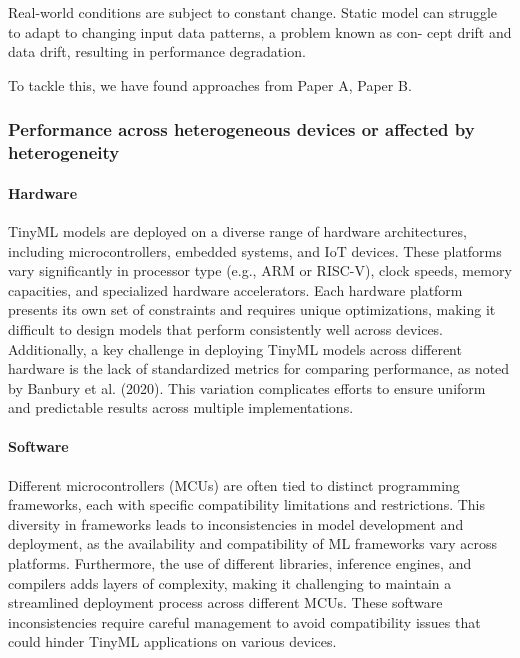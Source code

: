 \documentclass[twocolumn]{article}
\begin{document}
Real-world conditions are subject to constant change. Static model can struggle to adapt to changing input data patterns, a problem known as con- cept drift and data drift, resulting in performance degradation.

To tackle this, we have found approaches from Paper A, Paper B.

\subsubsection{Performance across heterogeneous devices or affected by heterogeneity}

\paragraph{Hardware} TinyML models are deployed on a diverse range of hardware architectures, including microcontrollers, embedded systems, and IoT devices. These platforms vary significantly in processor type (e.g., ARM or RISC-V), clock speeds, memory capacities, and specialized hardware accelerators. Each hardware platform presents its own set of constraints and requires unique optimizations, making it difficult to design models that perform consistently well across devices. Additionally, a key challenge in deploying TinyML models across different hardware is the lack of standardized metrics for comparing performance, as noted by Banbury et al. (2020). This variation complicates efforts to ensure uniform and predictable results across multiple implementations.

\paragraph{Software} Different microcontrollers (MCUs) are often tied to distinct programming frameworks, each with specific compatibility limitations and restrictions. This diversity in frameworks leads to inconsistencies in model development and deployment, as the availability and compatibility of ML frameworks vary across platforms. Furthermore, the use of different libraries, inference engines, and compilers adds layers of complexity, making it challenging to maintain a streamlined deployment process across different MCUs. These software inconsistencies require careful management to avoid compatibility issues that could hinder TinyML applications on various devices.
\end{document}
